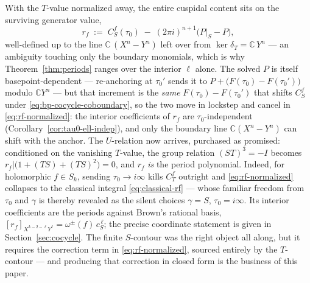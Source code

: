 \documentclass[11pt]{article}
\numberwithin{equation}{section}  %
\newcommand{\CC}{\mathbb{C}}
\begin{document}
With the $T$-value normalized away, the entire cuspidal content sits on
the surviving generator value,
\begin{equation}\label{eq:rf-normalized}
  r_f \;:=\; C^f_S(\tau_0) \;-\; (2\pi i)^{n+1}\bigl(P|_S - P\bigr),
\end{equation}
well-defined up to the line $\CC\,(X^n - Y^n)$ left over from
$\ker \delta_T = \CC\, Y^n$ --- an ambiguity touching only the boundary
monomials, which is why Theorem~\ref{thm:periods} ranges over the
interior $\ell$ alone.  The solved $P$ is itself basepoint-dependent ---
re-anchoring at $\tau_0'$ sends it to $P + \bigl(F(\tau_0)-F(\tau_0')\bigr)$
modulo $\CC Y^n$ --- but that increment is the \emph{same}
$F(\tau_0)-F(\tau_0')$ that shifts $C^f_S$ under
\eqref{eq:bp-cocycle-coboundary}, so the two move in lockstep and cancel
in \eqref{eq:rf-normalized}: the interior coefficients of $r_f$ are
$\tau_0$-independent (Corollary~\ref{cor:tau0-ell-indep}), and only the
boundary line $\CC(X^n - Y^n)$ can shift with the anchor.  The $U$-relation now arrives, purchased as
promised: conditioned on the vanishing $T$-value, the group relation
$(ST)^3 = -I$ becomes $r_f|\bigl(1 + (TS) + (TS)^2\bigr) = 0$, and $r_f$
\emph{is} the period polynomial.  Indeed, for holomorphic $f \in S_k$,
sending $\tau_0 \to i\infty$ kills $C^f_T$ outright and
\eqref{eq:rf-normalized} collapses to the classical integral
\eqref{eq:classical-rf} --- whose familiar freedom from $\tau_0$ and
$\gamma$ is thereby revealed as the silent choices $\gamma = S$,
$\tau_0 = i\infty$.  Its interior coefficients are the periods against
Brown's rational basis,
$[r_f]_{X^{k-2-\ell}Y^\ell} = \omega^\pm(f)\, c_S^{\,\ell}$; the precise
coordinate statement is given in Section~\ref{sec:cocycle}.  The finite
$S$-contour was the right object all along, but it requires the
correction term in \eqref{eq:rf-normalized}, sourced entirely by the
$T$-contour --- and producing that correction in closed form is the
business of this paper.


\end{document}

